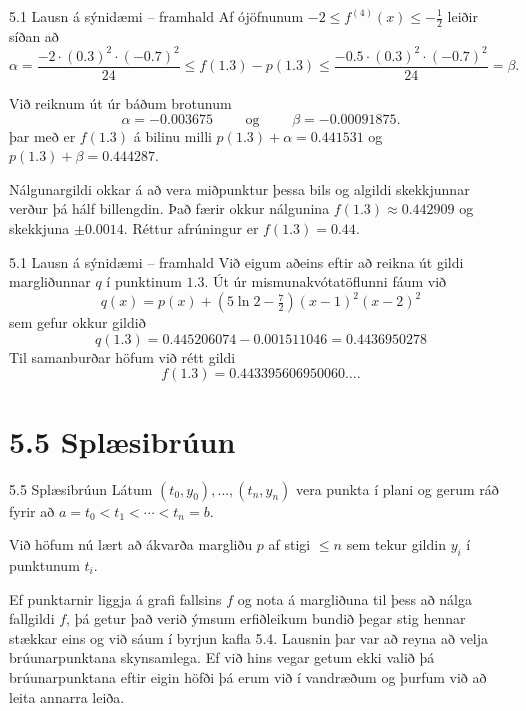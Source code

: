 \begin{frame}{5.1 Lausn á sýnidæmi -- framhald} 
Af ójöfnunum  $-2\leq f^{(4)}(x)\leq -\tfrac 12$
leiðir síðan að
$$
\alpha=\dfrac{-2\cdot(0.3)^2\cdot(-0.7)^2}{24}\leq f(1.3)-p(1.3)
\leq \dfrac{-0.5\cdot(0.3)^2\cdot(-0.7)^2}{24}=\beta.
$$

\pause
\smallskip
 Við reiknum út úr báðum brotunum
$$\alpha=-0.003675 \qquad \text{ og } \qquad 
\beta=-0.00091875.
$$
þar með er $f(1.3)$ á bilinu milli 
$p(1.3)+\alpha=0.441531$ og $p(1.3)+\beta=0.444287$.


\pause
Nálgunargildi okkar á að vera miðpunktur þessa bils og 
algildi skekkjunnar verður þá hálf billengdin.
Það færir okkur nálgunina
$f(1.3) \approx 0.442909$ og skekkjuna $\pm 0.0014$.
Réttur afrúningur er $f(1.3)=0.44$.
\end{frame}

\begin{frame}{5.1 Lausn á sýnidæmi -- framhald} 
Við eigum aðeins eftir að reikna út gildi 
margliðunnar $q$ í punktinum $1.3$.  Út úr mismunakvótatöflunni
fáum við
$$
q(x)=p(x)+(5\ln 2-\tfrac 72)(x-1)^2(x-2)^2
$$
sem gefur okkur gildið
$$
q(1.3)=0.445206074-0.001511046=0.4436950278
$$
Til samanburðar höfum við rétt gildi
$$f(1.3)=0.443395606950060\ldots.
$$
\end{frame}

\section*{5.5 Splæsibrúun}

\begin{frame}{5.5 Splæsibrúun} 
Látum $(t_0,y_0),\dots,(t_n,y_n)$ vera punkta í plani og gerum ráð
fyrir að $a=t_0<t_1<\cdots<t_n=b$. 

\pause
\smallskip
Við höfum nú lært að ákvarða
margliðu $p$ af stigi $\leq n$ sem tekur gildin $y_i$ í punktunum
$t_i$.  

\pause
\smallskip
Ef punktarnir liggja á grafi fallsins $f$ og nota á margliðuna
til þess að nálga fallgildi $f$, þá getur það verið ýmsum erfiðleikum
bundið þegar stig hennar stækkar eins og við sáum í byrjun kafla 5.4. 
Lausnin þar var að reyna að velja brúunarpunktana skynsamlega. 
Ef við hins vegar getum ekki valið þá brúunarpunktana eftir eigin höfði
þá erum við í vandræðum og þurfum við að leita annarra leiða. 

\end{frame}

